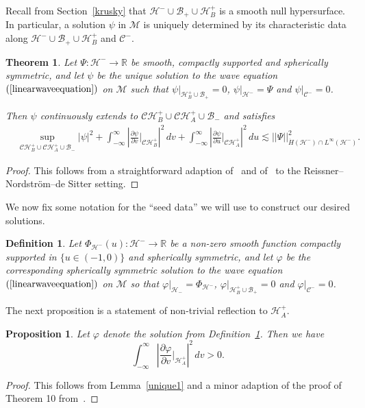 \documentclass[A4,10pt]{article}
\newtheorem{definition}{Definition}[section]
\newtheorem{theorem}{Theorem}[section]
\newtheorem{proposition}{Proposition}[subsection]
\begin{document}
Recall from Section~\ref{krusky} that $\mathcal{H}^-\cup\mathcal{B}_+\cup\mathcal{H}^+_B$ is a smooth null hypersurface. In particular, a solution $\psi$ in $\mathcal{M}$ is uniquely determined by its characteristic data along $\mathcal{H}^-\cup\mathcal{B}_+\cup\mathcal{H}^+_B$ and $\mathcal{C}^-$. 


\begin{theorem}\label{frantheo}Let $\Psi : \mathcal{H}^- \to \mathbb{R}$ be smooth, compactly supported and spherically symmetric, and let $\psi$ be the unique solution to the wave equation
$(\ref{linearwaveequation})$ on $\mathcal{M}$ such that $\psi|_{\mathcal{H}^+_B\cup \mathcal{B}_+} = 0$, $\psi|_{\mathcal{H}^-} = \Psi$ and $\psi|_{\mathcal{C}^-} = 0$.

Then $\psi$ continuously extends to  $\mathcal{CH}^+_B \cup \mathcal{CH}^+_A \cup \mathcal{B}_-$ and satisfies
\begin{align*}
&\sup_{\mathcal{CH}^+_B \cup \mathcal{CH}^+_A \cup \mathcal{B}_-}\left|\psi\right|^2 + \int_{-\infty}^{\infty}\left|\frac{\partial\psi}{\partial v}|_{\mathcal{CH}^+_B}\right|^2\, dv  +  \int_{-\infty}^{\infty}\left|\frac{\partial \psi}{\partial u}|_{\mathcal{CH}^+_A}\right|^2\, du  \lesssim \left\vert\left\vert \Psi\right\vert\right\vert^2_{\dot{H}\left(\mathcal{H}^-\right) \cap L^{\infty}\left(\mathcal{H}^-\right)}.
\end{align*}
\end{theorem}
\begin{proof}This follows from a straightforward adaption of~\cite{Dafermos:2007jd}  and of~\cite{annefranzen} to  the Reissner--Nordstr\"{o}m--de Sitter setting.
\end{proof}

We now fix some notation for the ``seed data'' we will use to construct our desired solutions.


\begin{definition}\label{seed}Let $\Phi_{\mathcal{H}^-}(u) : \mathcal{H}^- \to \mathbb{R}$ be a non-zero smooth function compactly supported in $\{u \in (-1,0)\}$ and spherically symmetric, and let $\varphi$ be the corresponding spherically symmetric solution to the wave equation $(\ref{linearwaveequation})$ on $\mathcal{M}$ so that $\varphi|_{\mathcal{H}_-} = \Phi_{\mathcal{H}^-}$, $\varphi|_{\mathcal{H}^+_B\cup\mathcal{B}_+} = 0$ and $\varphi|_{\mathcal{C}^-} = 0$. 
\end{definition}

The next proposition is a statement of non-trivial reflection to $\mathcal{H}^+_A$.
\begin{proposition}\label{itwenttohplus} Let $\varphi$ denote the solution from Definition~\ref{seed}. Then we have 
\[\int_{-\infty}^{\infty}\left|\frac{\partial \varphi}{\partial v}|_{\mathcal{H}^+_A}\right|^2\, dv  > 0.\]
\end{proposition}
\begin{proof}This follows from Lemma~\ref{unique1} and a minor adaption of the proof of Theorem 10 from~\cite{Dafermos:2014jwa}.
\end{proof}
\end{document}
